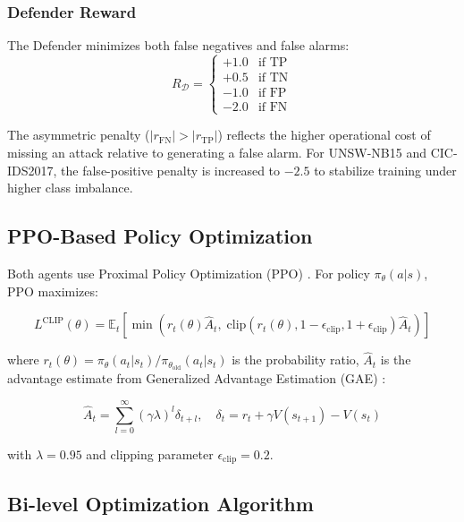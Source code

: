 \subsubsection{Defender Reward}
The Defender minimizes both false negatives and false alarms:
\begin{equation}
    R_{\mathcal{D}} = \begin{cases}
        +1.0 & \text{if TP} \\
        +0.5 & \text{if TN} \\
        -1.0 & \text{if FP} \\
        -2.0 & \text{if FN}
    \end{cases}
    \label{eq:defender_reward}
\end{equation}

The asymmetric penalty ($|r_{\text{FN}}| > |r_{\text{TP}}|$) reflects the higher operational cost of missing an attack relative to generating a false alarm. For UNSW-NB15 and CIC-IDS2017, the false-positive penalty is increased to $-2.5$ to stabilize training under higher class imbalance.

\subsection{PPO-Based Policy Optimization}

Both agents use Proximal Policy Optimization (PPO) \cite{schulman2017ppo}. For policy $\pi_\theta(a|s)$, PPO maximizes:

\begin{equation}
    L^{\text{CLIP}}(\theta) = \mathbb{E}_t \left[ \min \left( r_t(\theta) \hat{A}_t,\; \text{clip}(r_t(\theta), 1{-}\epsilon_{\text{clip}}, 1{+}\epsilon_{\text{clip}}) \hat{A}_t \right) \right]
    \label{eq:ppo}
\end{equation}

where $r_t(\theta) = \pi_\theta(a_t|s_t) / \pi_{\theta_\text{old}}(a_t|s_t)$ is the probability ratio, $\hat{A}_t$ is the advantage estimate from Generalized Advantage Estimation (GAE) \cite{schulman2015gae}:

\begin{equation}
    \hat{A}_t = \sum_{l=0}^{\infty} (\gamma\lambda)^l \delta_{t+l}, \quad \delta_t = r_t + \gamma V(s_{t+1}) - V(s_t)
    \label{eq:gae}
\end{equation}

with $\lambda = 0.95$ and clipping parameter $\epsilon_{\text{clip}} = 0.2$.

\subsection{Bi-level Optimization Algorithm}

